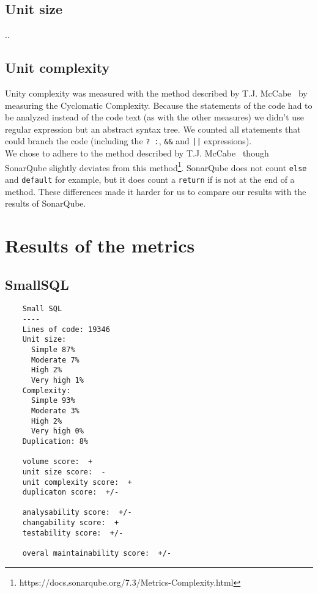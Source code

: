 \documentclass[journal]{IEEEtran}
\begin{document}
\subsection{Unit size}
..
\subsection{Unit complexity}
Unity complexity was measured with the method described by T.J. McCabe~\cite{complexity} by measuring the Cyclomatic Complexity. Because the statements of the code had to be analyzed instead of the code text (as with the other measures) we didn't use regular expression but an abstract syntax tree. We counted all statements that could branch the code (including the \verb|? :|, \verb|&&| and \verb"||" expressions).\\

We chose to adhere to the method described by T.J. McCabe~\cite{complexity} though SonarQube slightly deviates from this method\footnote{https://docs.sonarqube.org/7.3/Metrics-Complexity.html}. SonarQube does not count \verb|else| and \verb|default| for example, but it does count a \verb|return| if is not at the end of a method. These differences made it harder for us to compare our results with the results of SonarQube.







\appendices
\section{Results of the metrics}
\subsection{SmallSQL}
\begin{verbatim}
    Small SQL
    ----
    Lines of code: 19346
    Unit size: 
      Simple 87%
      Moderate 7%
      High 2%
      Very high 1%
    Complexity: 
      Simple 93%
      Moderate 3%
      High 2%
      Very high 0%
    Duplication: 8%
    
    volume score:  +
    unit size score:  -
    unit complexity score:  +
    duplicaton score:  +/-
    
    analysability score:  +/-
    changability score:  +
    testability score:  +/-

    overal maintainability score:  +/-
\end{verbatim}
\end{document}
